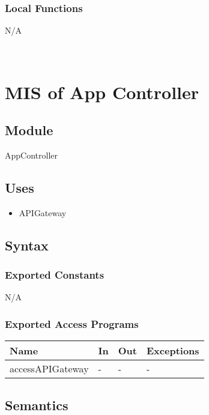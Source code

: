 \documentclass[12pt, titlepage]{article}
\begin{document}
\subsubsection{Local Functions}
N/A

~\newpage

\section{MIS of App Controller \label{mAppController} }

\subsection{Module}

AppController

\subsection{Uses}

\begin{itemize}
  \item APIGateway
\end{itemize}

\subsection{Syntax}

\subsubsection{Exported Constants}

N/A

\subsubsection{Exported Access Programs}

\begin{center}
\begin{tabular}{p{8cm} p{4cm} p{2cm} p{2cm}}
\hline
\textbf{Name} & \textbf{In} & \textbf{Out} & \textbf{Exceptions} \\
\hline
accessAPIGateway & - & - & - \\
\hline
\end{tabular}
\end{center}

\subsection{Semantics}
\end{document}
